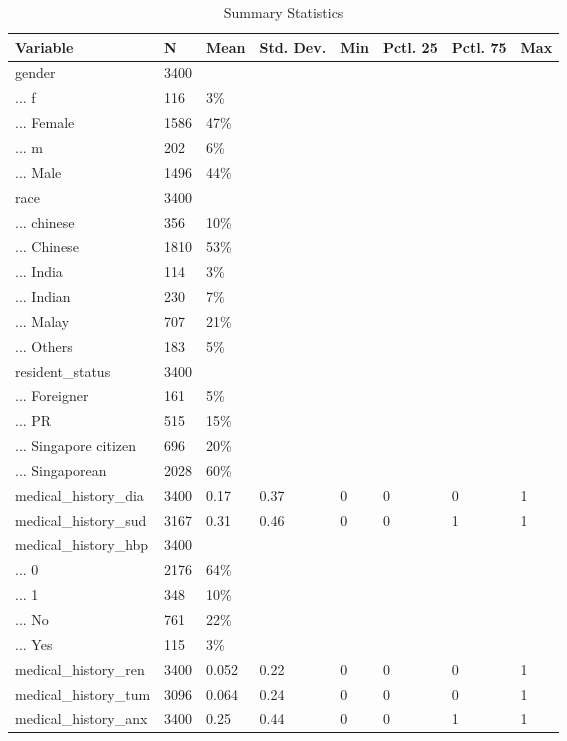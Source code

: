\documentclass[
]{article}
\begin{document}
\begin{table}

\caption{\label{tab:unnamed-chunk-4}Summary Statistics}
\centering
\begin{tabular}[t]{llllllll}
\toprule
Variable & N & Mean & Std. Dev. & Min & Pctl. 25 & Pctl. 75 & Max\\
\midrule
gender & 3400 &  &  &  &  &  & \\
... f & 116 & 3\% &  &  &  &  & \\
... Female & 1586 & 47\% &  &  &  &  & \\
... m & 202 & 6\% &  &  &  &  & \\
... Male & 1496 & 44\% &  &  &  &  & \\
\addlinespace
race & 3400 &  &  &  &  &  & \\
... chinese & 356 & 10\% &  &  &  &  & \\
... Chinese & 1810 & 53\% &  &  &  &  & \\
... India & 114 & 3\% &  &  &  &  & \\
... Indian & 230 & 7\% &  &  &  &  & \\
\addlinespace
... Malay & 707 & 21\% &  &  &  &  & \\
... Others & 183 & 5\% &  &  &  &  & \\
resident\_status & 3400 &  &  &  &  &  & \\
... Foreigner & 161 & 5\% &  &  &  &  & \\
... PR & 515 & 15\% &  &  &  &  & \\
\addlinespace
... Singapore citizen & 696 & 20\% &  &  &  &  & \\
... Singaporean & 2028 & 60\% &  &  &  &  & \\
medical\_history\_dia & 3400 & 0.17 & 0.37 & 0 & 0 & 0 & 1\\
medical\_history\_sud & 3167 & 0.31 & 0.46 & 0 & 0 & 1 & 1\\
medical\_history\_hbp & 3400 &  &  &  &  &  & \\
\addlinespace
... 0 & 2176 & 64\% &  &  &  &  & \\
... 1 & 348 & 10\% &  &  &  &  & \\
... No & 761 & 22\% &  &  &  &  & \\
... Yes & 115 & 3\% &  &  &  &  & \\
medical\_history\_ren & 3400 & 0.052 & 0.22 & 0 & 0 & 0 & 1\\
\addlinespace
medical\_history\_tum & 3096 & 0.064 & 0.24 & 0 & 0 & 0 & 1\\
medical\_history\_anx & 3400 & 0.25 & 0.44 & 0 & 0 & 1 & 1\\

\end{tabular}
\end{table}
\end{document}
